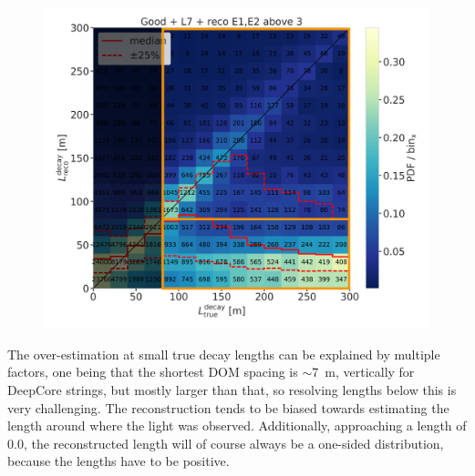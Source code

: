 \begin{figure}[h]
    \includegraphics{figures/results/190607/second_population/190607_millipede_level_no_NaNs_NEW_flipped_reco_decayL_vs_true_decayL_reco_above3_step_contours_populations.png}
    \caption[]{}
\end{figure}

The over-estimation at small true decay lengths can be explained by multiple factors, one being that the shortest DOM spacing is $\sim$\SI{7}{\meter}, vertically for DeepCore strings, but mostly larger than that, so resolving lengths below this is very challenging. The reconstruction tends to be biased towards estimating the length around where the light was observed. Additionally, approaching a length of 0.0, the reconstructed length will of course always be a one-sided distribution, because the lengths have to be positive.

